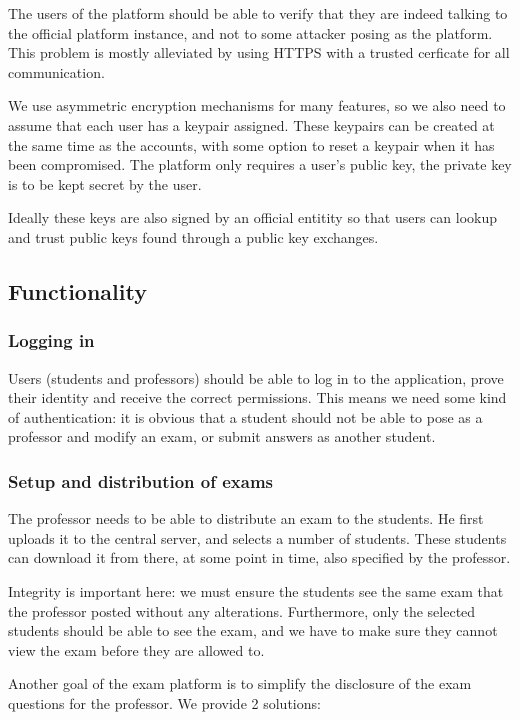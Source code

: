 \documentclass{article}
\begin{document}
The users of the platform should be able to verify that they are indeed talking
to the official platform instance, and not to some attacker posing as the
platform. This problem is mostly alleviated by using HTTPS with a trusted
cerficate for all communication.

We use asymmetric encryption mechanisms for many features, so we also need to
assume that each user has a keypair assigned. These keypairs can be created at
the same time as the accounts, with some option to reset a keypair when it has
been compromised. The platform only requires a user's public key, the private
key is to be kept secret by the user.

Ideally these keys are also signed by an official entitity so that users can
lookup and trust public keys found through a public key exchanges.

\subsection{Functionality}
\label{subsec:req-functionality}

\subsubsection{Logging in}

Users (students and professors) should be able to log in to the application,
prove their identity and receive the correct permissions. This means we need
some kind of authentication: it is obvious that a student should not be able to
pose as a professor and modify an exam, or submit answers as another student.

\subsubsection{Setup and distribution of exams}

The professor needs to be able to distribute an exam to the students. He first
uploads it to the central server, and selects a number of students. These
students can download it from there, at some point in time, also specified by
the professor.

Integrity is important here: we must ensure the students see the same exam that
the professor posted without any alterations. Furthermore, only the selected
students should be able to see the exam, and we have to make sure they cannot
view the exam before they are allowed to.

Another goal of the exam platform is to simplify the disclosure of the exam
questions for the professor. We provide 2 solutions:
\end{document}
